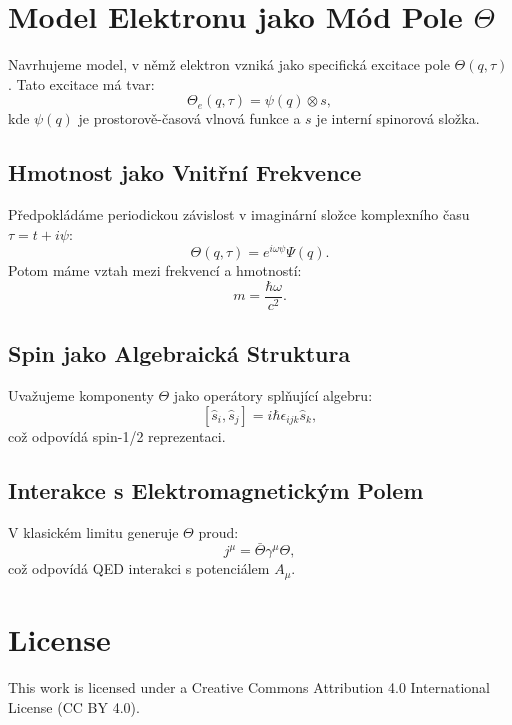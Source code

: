\documentclass{article}
\begin{document}
\section*{Model Elektronu jako Mód Pole \(\Theta\)}

Navrhujeme model, v němž elektron vzniká jako specifická excitace pole \(\Theta(q, \tau)\). Tato excitace má tvar:
\[
\Theta_e(q, \tau) = \psi(q) \otimes s,
\]
kde \(\psi(q)\) je prostorově-časová vlnová funkce a \(s\) je interní spinorová složka.

\subsection*{Hmotnost jako Vnitřní Frekvence}
Předpokládáme periodickou závislost v imaginární složce komplexního času \(\tau = t + i\psi\):
\[
\Theta(q, \tau) = e^{i\omega \psi} \Psi(q).
\]
Potom máme vztah mezi frekvencí a hmotností:
\[
m = \frac{\hbar \omega}{c^2}.
\]

\subsection*{Spin jako Algebraická Struktura}
Uvažujeme komponenty \(\Theta\) jako operátory splňující algebru:
\[
[\hat{s}_i, \hat{s}_j] = i \hbar \epsilon_{ijk} \hat{s}_k,
\]
což odpovídá spin-1/2 reprezentaci.

\subsection*{Interakce s Elektromagnetickým Polem}
V klasickém limitu generuje \(\Theta\) proud:
\[
j^\mu = \bar{\Theta} \gamma^\mu \Theta,
\]
což odpovídá QED interakci s potenciálem \(A_\mu\).


\section*{License}
This work is licensed under a Creative Commons Attribution 4.0 International License (CC BY 4.0).
\end{document}
